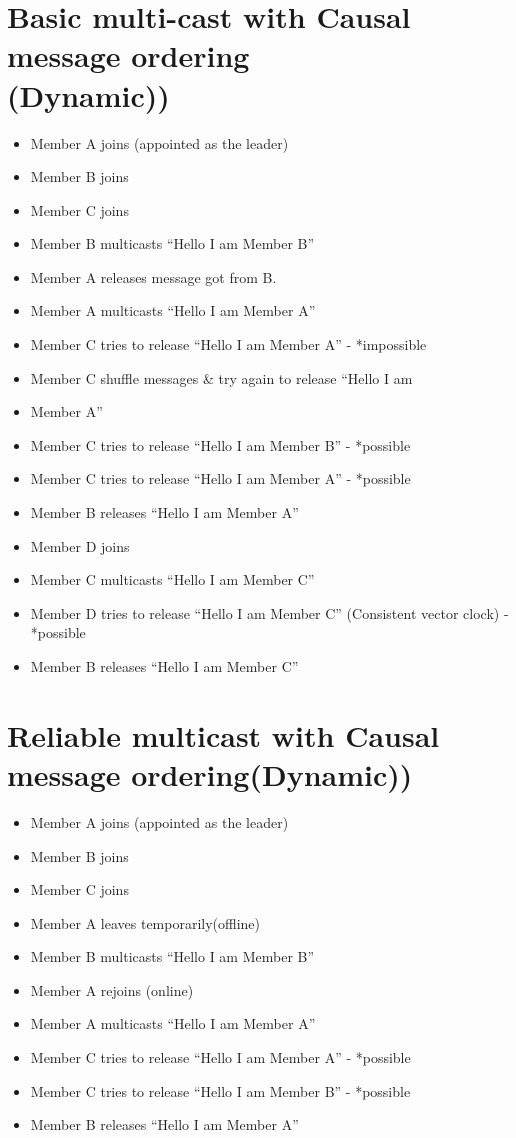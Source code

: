 \documentclass[a4,12pt]{article}
\begin{document}
\section*{Basic multi-cast with Causal message ordering\\(Dynamic))}
\begin{itemize}\itemsep 1pt \parskip 1pt \parsep 2pt
\item Member A joins (appointed as the leader)
\item Member B joins
\item Member C joins
\item Member B multicasts “Hello I am Member B”
\item Member A releases message got from B.
\item Member A multicasts “Hello I am Member A”
\item Member C tries to release “Hello I am Member A” - *impossible
\item Member C shuffle messages \& try again to release “Hello I am \item Member A”
\item Member C tries to release “Hello I am Member B” - *possible
\item Member C tries to release “Hello I am Member A” - *possible
\item Member B releases “Hello I am Member A”
\item Member D joins
\item Member C multicasts “Hello I am Member C”
\item Member D tries to release “Hello I am Member C” (Consistent vector clock) - *possible
\item Member B releases “Hello I am Member C” 
\end{itemize}


\section*{Reliable multicast with Causal message ordering(Dynamic))}
\begin{itemize}\itemsep 1pt \parskip 1pt \parsep 2pt
\item Member A joins (appointed as the leader)
\item Member B joins
\item Member C joins
\item Member A leaves temporarily(offline)
\item Member B multicasts “Hello I am Member B”
\item Member A rejoins (online)
\item Member A multicasts “Hello I am Member A”
\item Member C tries to release “Hello I am Member A” - *possible
\item Member C tries to release “Hello I am Member B” - *possible
\item Member B releases “Hello I am Member A”
\end{itemize}
\end{document}
